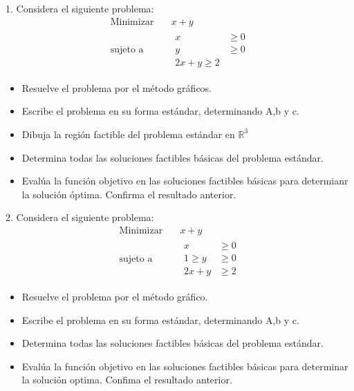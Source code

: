 \documentclass{article}
\begin{document}
1. Considera el siguiente problema:
\begin{equation*}
  \begin{aligned}
    \text{Minimizar}\quad & x+y\\
    \text{sujeto a}\quad  &
     \begin{aligned}
      x & \geq 0 \\
      y & \geq 0 \\
      2x+y \geq 2
     \end{aligned}
  \end{aligned}
\end{equation*}
\begin{itemize}
\item Resuelve el problema por el método gráficos.
\item Escribe el problema en su forma estándar, determinando A,b y c.
\item Dibuja la región factible del problema estándar en $\mathbb{R}^3$
\item Determina todas las soluciones factibles básicas del problema estándar.
\item Evalúa la función objetivo en las soluciones factibles básicas para determianr la solución óptima. Confirma el resultado anterior.
\end{itemize}
2. Considera el siguiente  problema:
\begin{equation*}
  \begin{aligned}
    \text{Minimizar}\quad  & x+y \\
    \text{sujeto a}\quad  &
  \begin{aligned}
    x & \geq 0\\ 
 1 \geq  y & \geq 0\\
2x + y & \geq 2
  \end{aligned}
  \end{aligned}
\end{equation*}

\begin{itemize}
\item Resuelve el problema por el método gráfico.
\item  Escribe el problema en su forma estándar, determinando A,b y c.
\item Determina todas las soluciones factibles básicas del problema estándar.
  \item Evalúa la función objetivo en las soluciones factibles básicas para determinar la solución optima. Confima el resultado anterior.
  \end{itemize}
\end{document}

